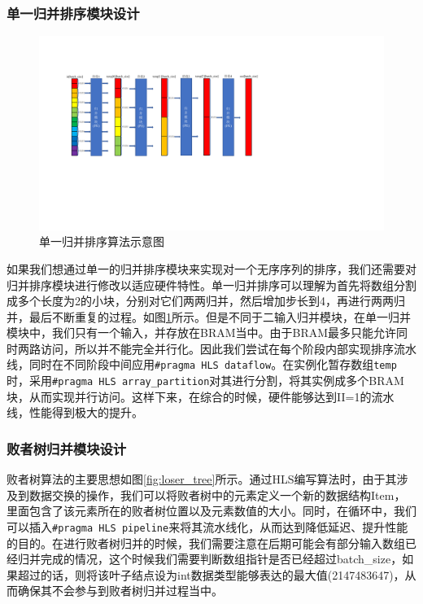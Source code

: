 \subsubsection{单一归并排序模块设计}
\begin{figure}[htbp]
    \centering
    \includegraphics[width=\linewidth]{figures/merge_sort.pdf}
    \caption{单一归并排序算法示意图}
    \label{fig:merge_sort}
\end{figure}
如果我们想通过单一的归并排序模块来实现对一个无序序列的排序，我们还需要对归并排序模块进行修改以适应硬件特性。单一归并排序可以理解为首先将数组分割成多个长度为2的小块，分别对它们两两归并，然后增加步长到4，再进行两两归并，最后不断重复的过程。如图\ref{fig:merge_sort}所示。但是不同于二输入归并模块，在单一归并模块中，我们只有一个输入，并存放在BRAM当中。由于BRAM最多只能允许同时两路访问，所以并不能完全并行化。因此我们尝试在每个阶段内部实现排序流水线，同时在不同阶段中间应用\verb|#pragma HLS dataflow|。在实例化暂存数组\verb|temp|时，采用\verb|#pragma HLS array_partition|对其进行分割，将其实例成多个BRAM块，从而实现并行访问。这样下来，在综合的时候，硬件能够达到II=1的流水线，性能得到极大的提升。

\subsubsection{败者树归并模块设计}

败者树算法的主要思想如图\ref{fig:loser_tree}所示。通过HLS编写算法时，由于其涉及到数据交换的操作，我们可以将败者树中的元素定义一个新的数据结构Item，里面包含了该元素所在的败者树位置以及元素数值的大小。同时，在循环中，我们可以插入\verb|#pragma HLS pipeline|来将其流水线化，从而达到降低延迟、提升性能的目的。在进行败者树归并的时候，我们需要注意在后期可能会有部分输入数组已经归并完成的情况，这个时候我们需要判断数组指针是否已经超过batch\_size，如果超过的话，则将该叶子结点设为int数据类型能够表达的最大值(2147483647)，从而确保其不会参与到败者树归并过程当中。
